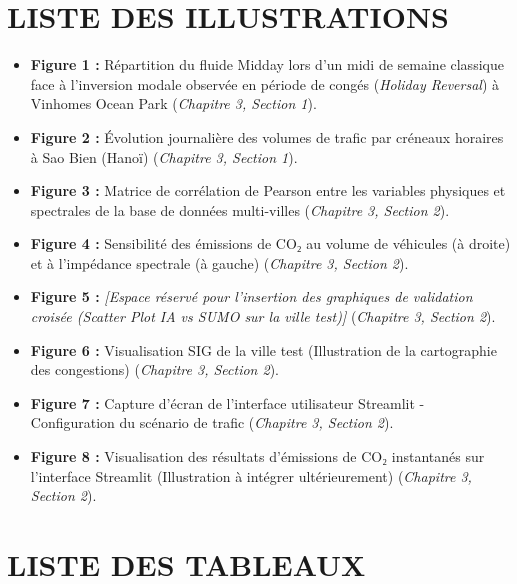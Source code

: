 \documentclass[10pt, a4paper]{article}
\providecommand{\tightlist}{}
\begin{document}
\newpage

\section{LISTE DES ILLUSTRATIONS}\label{liste-des-illustrations}

\begin{itemize}
\tightlist
\item
  \textbf{Figure 1 :} Répartition du fluide Midday lors d'un midi de
  semaine classique face à l'inversion modale observée en période de
  congés (\emph{Holiday Reversal}) à Vinhomes Ocean Park (\emph{Chapitre
  3, Section 1}).
\item
  \textbf{Figure 2 :} Évolution journalière des volumes de trafic par
  créneaux horaires à Sao Bien (Hanoï) (\emph{Chapitre 3, Section 1}).
\item
  \textbf{Figure 3 :} Matrice de corrélation de Pearson entre les
  variables physiques et spectrales de la base de données multi-villes
  (\emph{Chapitre 3, Section 2}).
\item
  \textbf{Figure 4 :} Sensibilité des émissions de CO₂ au volume de
  véhicules (à droite) et à l'impédance spectrale (à gauche)
  (\emph{Chapitre 3, Section 2}).
\item
  \textbf{Figure 5 :} \emph{{[}Espace réservé pour l'insertion des
  graphiques de validation croisée (Scatter Plot IA vs SUMO sur la ville
  test){]}} (\emph{Chapitre 3, Section 2}).
\item
  \textbf{Figure 6 :} Visualisation SIG de la ville test (Illustration
  de la cartographie des congestions) (\emph{Chapitre 3, Section 2}).
\item
  \textbf{Figure 7 :} Capture d'écran de l'interface utilisateur
  Streamlit - Configuration du scénario de trafic (\emph{Chapitre 3,
  Section 2}).
\item
  \textbf{Figure 8 :} Visualisation des résultats d'émissions de CO₂
  instantanés sur l'interface Streamlit (Illustration à intégrer
  ultérieurement) (\emph{Chapitre 3, Section 2}).
\end{itemize}

\newpage

\section{LISTE DES TABLEAUX}\label{liste-des-tableaux}
\end{document}

